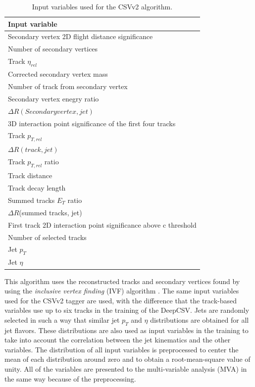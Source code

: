 \begin{table}[htbp]
    \caption{Input variables used for the CSVv2 algorithm.}
    \centering
    \begin{tabular}{l}
        \hline
        Input variable                                            \\ 
        \hline 
        Secondary vertex 2D flight distance significance\\
        Number of secondary vertices\\
        Track $\eta_{rel}$\\
        Corrected secondary vertex mass\\
        Number of track from secondary vertex\\
        Secondary vertex enegry ratio\\
        $\Delta R (Secondary vertex, jet)$ \\
        3D interaction point significance of the first four tracks\\
        Track $p_{T,rel}$\\
        $\Delta R (track, jet)$ \\
        Track $p_{T,rel}$ ratio\\
        Track distance\\
        Track decay length\\
        Summed tracks $E_{T}$ ratio\\
        $\Delta R$(summed tracks, jet)\\
        First track 2D interaction point significance above c threshold\\
        Number of selected tracks\\
        Jet $p_{T}$\\
        Jet $\eta$\\
        \hline 
    \end{tabular}
    \label{tab:csvv2var}
\end{table}

This algorithm uses the reconstructed tracks and secondary vertices found by using the \textit{inclusive vertex finding} (IVF) algorithm \cite{ADAM2007781}. The same input variables used for the CSVv2 tagger are used, with the difference that the track-based variables use up to six tracks in the training of the DeepCSV. Jets are randomly selected in such a way that similar jet $p_{T}$ and $\eta$ distributions are obtained for all jet flavors. These distributions are also used as input variables in the training to take into account the correlation between the jet kinematics and the other variables. The distribution of all input variables is preprocessed to center the mean of each distribution around zero and to obtain a root-mean-square value of unity. All of the variables are presented to the multi-variable analysis (MVA) in the same way because of the preprocessing.

